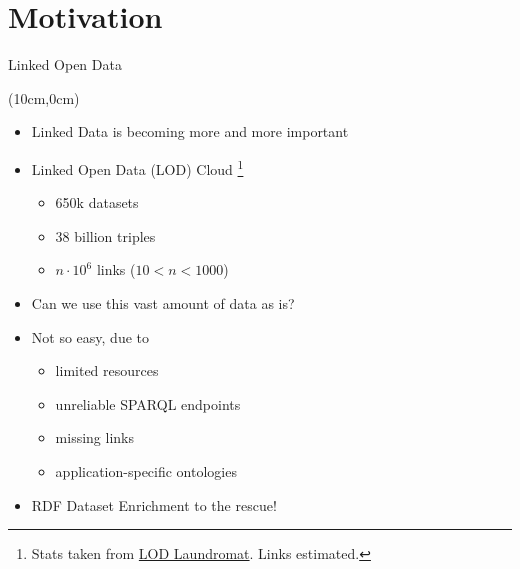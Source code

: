 \documentclass[aspectratio=1610]{beamer}
\begin{document}
\section{Motivation}
\begin{frame}{Linked Open Data}
\begin{textblock*}{5cm}(10cm,0cm) %
\end{textblock*}
\begin{itemize}
\item<1-> Linked Data is becoming more and more important
\item<2-> Linked Open Data (LOD) Cloud \footnote{Stats taken from \href{https://lodlaundromat.org}{LOD Laundromat}. Links estimated.}
{\begin{itemize}
  \item 650k datasets
  \item 38 billion triples
  \item $n\cdot10^6$ links ($10 < n < 1000$)
\end{itemize}}
\item<3->{Can we use this vast amount of data as is?}
\item<5-> Not so easy, due to
{\begin{itemize}
  \item<5-> limited resources
  \item<6-> unreliable SPARQL endpoints
  \item<7-> missing links
  \item<8-> application-specific ontologies
\end{itemize}}
\item<9-> RDF Dataset Enrichment to the rescue!
\end{itemize}
\end{frame}
\end{document}
